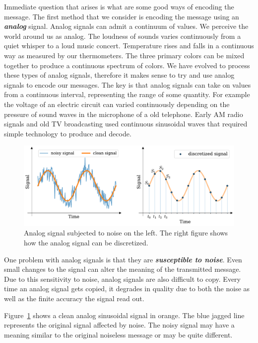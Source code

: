 Immediate question that arises is what are some good ways of encoding the message.
The first method that we consider is encoding the message using an \textit{\textbf{analog}} signal.
Analog signals can admit a continuum of values.
We perceive the world around us as analog.
The loudness of sounds varies continuously from a quiet whisper to a loud music concert.
Temperature rises and falls in a continuous way as measured by our thermometers.
The three primary colors can be mixed together to produce a continuous spectrum of colors.
We have evolved to process these types of analog signals, therefore it makes sense to try and use analog signals to encode our messages.
The key is that analog signals can take on values from a continuous interval, representing the range of some quantity.
For example the voltage of an electric circuit can varied continuously depending on the pressure of sound waves in the microphone of a old telephone.
Early AM radio signals and old TV broadcasting used continuous sinusoidal waves that required simple technology to produce and decode.

\begin{figure}[t]
    \centering
    \includegraphics[width=\textwidth]{lesson1/1-2_signals.pdf}
    \caption[Continuous and discrete signals]{Analog signal subjected to noise on the left. The right figure shows how the analog signal can be discretized.}
    \label{fig:1-2_signals}
\end{figure}

One problem with analog signals is that they are \textit{\textbf{susceptible to noise}}.
Even small changes to the signal can alter the meaning of the transmitted message.
Due to this sensitivity to noise, analog signals are also difficult to copy.
Every time an analog signal gets copied, it degrades in quality due to both the noise as well as the finite accuracy the signal read out.

Figure~\ref{fig:1-2_signals} shows a clean analog sinusoidal signal in orange.
The blue jagged line represents the original signal affected by noise.
The noisy signal may have a meaning similar to the original noiseless message or may be quite different.


